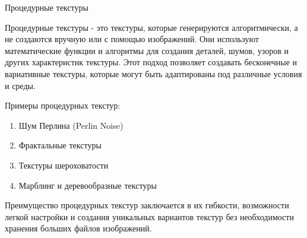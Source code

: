 \documentclass{beamer}
\begin{document}
	\begin{frame}{Процедурные текстуры}

		Процедурные текстуры - это текстуры, которые генерируются алгоритмически, а не создаются вручную или с помощью изображений. 
		Они используют математические функции и алгоритмы для создания деталей, шумов, узоров и других характеристик текстуры. Этот подход позволяет создавать бесконечные и вариативные текстуры, которые могут быть адаптированы под различные условия и среды.

Примеры процедурных текстур:
\begin{enumerate}
	\item 
	Шум Перлина (Perlin Noise)%
	\item
	Фрактальные текстуры%
	\item
	Текстуры шероховатости%
	\item
	Марблинг и деревообразные текстуры%
\end{enumerate}

	Преимущество процедурных текстур заключается в их гибкости, возможности легкой настройки и создания уникальных вариантов текстур без необходимости хранения больших файлов изображений.

	\end{frame}
\end{document}
